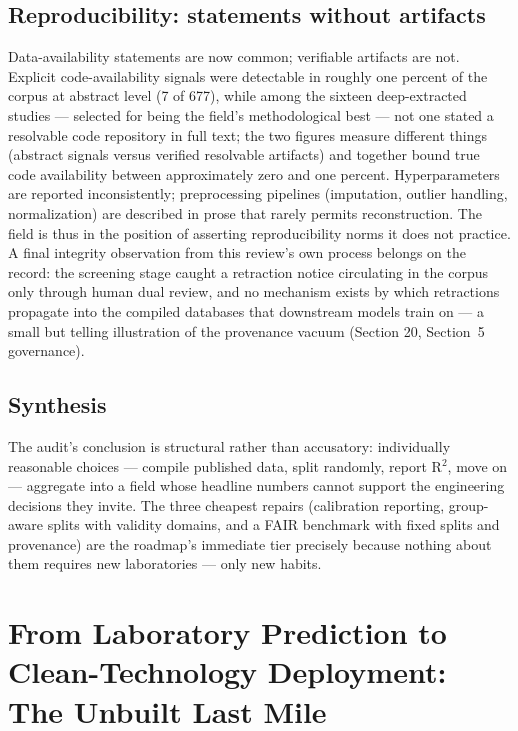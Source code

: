 \documentclass[pdflatex,sn-basic]{sn-jnl}
\begin{document}
\subsection{Reproducibility: statements without artifacts}

Data-availability statements are now common; verifiable artifacts are not. Explicit code-availability signals were detectable in roughly one percent of the corpus at abstract level (7 of 677), while among the sixteen deep-extracted studies --- selected for being the field's methodological best --- not one stated a resolvable code repository in full text; the two figures measure different things (abstract signals versus verified resolvable artifacts) and together bound true code availability between approximately zero and one percent. Hyperparameters are reported inconsistently; preprocessing pipelines (imputation, outlier handling, normalization) are described in prose that rarely permits reconstruction. The field is thus in the position of asserting reproducibility norms it does not practice. A final integrity observation from this review's own process belongs on the record: the screening stage caught a retraction notice circulating in the corpus only through human dual review, and no mechanism exists by which retractions propagate into the compiled databases that downstream models train on --- a small but telling illustration of the provenance vacuum (Section 20, Section~5 governance).

\subsection{Synthesis}

The audit's conclusion is structural rather than accusatory: individually reasonable choices --- compile published data, split randomly, report R$^2$, move on --- aggregate into a field whose headline numbers cannot support the engineering decisions they invite. The three cheapest repairs (calibration reporting, group-aware splits with validity domains, and a FAIR benchmark with fixed splits and provenance) are the roadmap's immediate tier precisely because nothing about them requires new laboratories --- only new habits.

\section{From Laboratory Prediction to Clean-Technology Deployment: The Unbuilt Last Mile}
\end{document}
